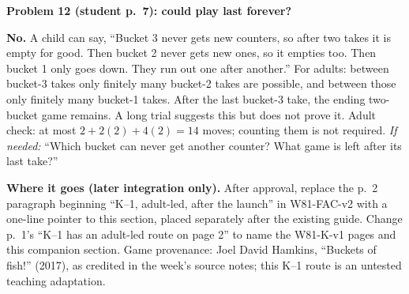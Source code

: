 \documentclass[11pt]{article}
\newcommand{\sub}[1]{\par\textbf{#1}\par}
\newcommand{\hint}[1]{\textit{If needed:} #1}
\begin{document}
\sub{Problem 12 (student p.\ 7): could play last forever?}
\textbf{No.} A child can say, ``Bucket 3 never gets new counters, so after two takes it is empty for good. Then bucket 2 never gets new ones, so it empties too. Then bucket 1 only goes down. They run out one after another.'' For adults: between bucket-3 takes only finitely many bucket-2 takes are possible, and between those only finitely many bucket-1 takes. After the last bucket-3 take, the ending two-bucket game remains. A long trial suggests this but does not prove it. Adult check: at most $2+2(2)+4(2)=14$ moves; counting them is not required. \hint{``Which bucket can never get another counter? What game is left after its last take?''}

{\footnotesize \textbf{Where it goes (later integration only).} After approval, replace the p.\ 2 paragraph beginning ``K--1, adult-led, after the launch'' in W81-FAC-v2 with a one-line pointer to this section, placed separately after the existing guide. Change p.\ 1's ``K--1 has an adult-led route on page 2'' to name the W81-K-v1 pages and this companion section. Game provenance: Joel David Hamkins, ``Buckets of fish!'' (2017), as credited in the week's source notes; this K--1 route is an untested teaching adaptation.}
\end{document}
